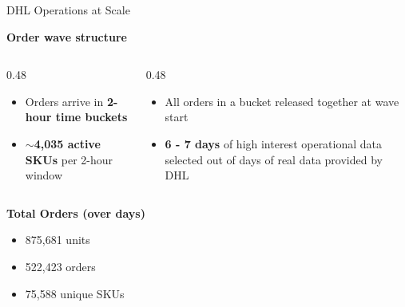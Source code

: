 \documentclass[aspectratio=169, 12pt]{beamer}
\begin{document}
\begin{frame}{DHL Operations at Scale}

\textbf{Order wave structure}
\vspace{0.2em}

\begin{columns}[T,onlytextwidth]
  \begin{column}{0.48\textwidth}
    \begin{itemize}\setlength{\itemsep}{0.6em}
      \item \small Orders arrive in \textbf{2-hour time buckets}
      \item \small \textbf{$\sim$4{,}035 active SKUs} per 2-hour window
    \end{itemize}
  \end{column}
  \begin{column}{0.48\textwidth}
    \begin{itemize}\setlength{\itemsep}{0.6em}
      \item \small All orders in a bucket released together at wave start
      \item \small \textbf{6 - 7 days} of high interest operational data selected out of  days of real data provided by DHL
    \end{itemize}
  \end{column}
\end{columns}

\vspace{0.4em}

\textbf{Total Orders (over  days)}
\vspace{0.1em}

\begin{itemize}\setlength{\itemsep}{0.3em}
  \item 875,681 units
  \item 522,423 orders
  \item 75,588 unique SKUs
\end{itemize}

\end{frame}
\end{document}
